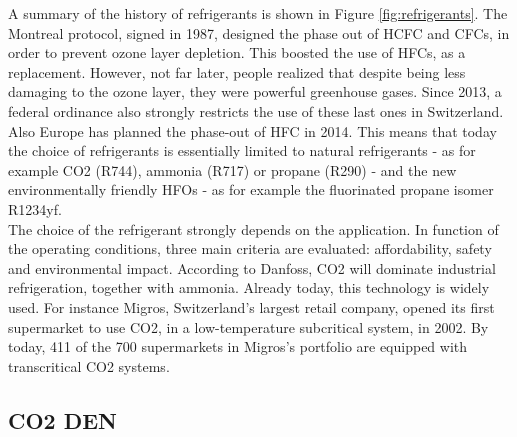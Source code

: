 \documentclass{article}
\begin{document}
A summary of the history of refrigerants is shown in Figure \ref{fig:refrigerants}.
The Montreal protocol, signed in 1987, designed the phase out of HCFC and CFCs, in order to prevent ozone layer depletion. This boosted the use of HFCs, as a replacement. However, not far later, people realized that despite being less damaging to the ozone layer, they were powerful greenhouse gases. Since 2013, a federal ordinance also strongly restricts the use of these last ones in Switzerland\cite{hydrocarbons21.comSwitzerlandIntroduceHFC}. Also Europe has planned the phase-out of HFC in 2014\cite{europeancommissionforclimateactionEULegislationControl2016}. This means that today the choice of refrigerants is essentially limited to natural refrigerants - as for example CO2 (R744), ammonia (R717) or propane (R290) - and the new environmentally friendly HFOs - as for example the fluorinated propane isomer R1234yf.\\
The choice of the refrigerant strongly depends on the application. In function of the operating conditions, three main criteria are evaluated: affordability, safety and environmental impact. According to Danfoss\cite{danfossRefrigerantOptionsNow2017}, CO2 will dominate industrial refrigeration, together with ammonia. Already today, this technology is widely used. For instance Migros, Switzerland's largest retail company, opened its first supermarket to use CO2, in a low-temperature subcritical system, in 2002. By today, 411 of the 700 supermarkets in Migros’s portfolio are equipped with transcritical CO2 systems\cite{williamsMigrosDNA2018}.

\subsection{CO2 DEN}
\end{document}
